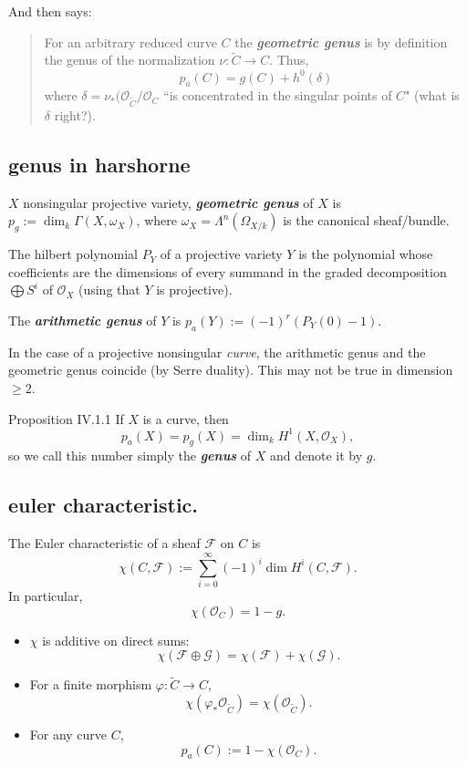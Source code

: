 And then \cite{huk} says:
\begin{quotation}
For an arbitrary reduced curve \(C\) the \textit{\textbf{geometric genus}} is by definition the genus of the normalization \(\nu:\tilde{C} \to C\). Thus, \[\boxed{p_a(C)=g(C)+h^{0}(\delta)}\]
where \(\delta=\nu_*(\mathcal{O}_{\tilde{C}}/\mathcal{O}_C\) ``is concentrated in the singular points of \(C\)" (what is \(\delta\) right?).
\end{quotation}

\subsection*{genus in harshorne}
\begin{defn}\leavevmode
\(X\) nonsingular projective variety, \textit{\textbf{geometric genus}} of \(X\) is \(p_g:=\dim_k\Gamma(X,\omega_X)\), where \(\omega_X=\Lambda^{n}(\Omega_{X/k})\) is the canonical sheaf/bundle.
\end{defn}

\begin{defn}[p. 54]\leavevmode
The hilbert polynomial \(P_Y\) of a projective variety  \(Y\) is the polynomial whose coefficients are the dimensions of every summand in the graded decomposition \(\bigoplus S^i\) of \(\mathcal{O}_X\) (using that \(Y\) is projective).

The \textit{\textbf{arithmetic genus}} of \(Y\) is \(p_a(Y):=(-1)^{r}(P_Y(0)-1).\)
\end{defn}

\begin{remark}\leavevmode
	In the case of a projective nonsingular \textit{curve}, the arithmetic genus and the geometric genus coincide (by Serre duality). This may not be true in dimension \(\geq 2\).
\end{remark}

\begin{thing4}{Proposition IV.1.1}\label{prop:IV.1.1}\leavevmode
If \(X\) is a curve, then
\[p_a(X)=p_g(X)=\dim_kH^{1}(X,\mathcal{O}_X),\]
so we call this number simply the \textit{\textbf{genus}} of \(X\) and denote it by \(g\).
\end{thing4}




\subsection{euler characteristic.}
The Euler characteristic of a sheaf \( \mathcal{F} \) on \( C \) is
\[
\chi(C, \mathcal{F}) := \sum_{i=0}^\infty (-1)^i \dim H^i(C, \mathcal{F}).
\]
In particular,
\[
\chi(\mathcal{O}_C) = 1 - g.
\]
\begin{itemize}
  \item \(\chi\) is additive on direct sums:
  \[
  \chi(\mathcal{F} \oplus \mathcal{G}) = \chi(\mathcal{F}) + \chi(\mathcal{G}).
  \]
  \item For a finite morphism \( \varphi: \widetilde{C} \to C \),
  \[
  \chi(\varphi_*\mathcal{O}_{\widetilde{C}}) = \chi(\mathcal{O}_{\widetilde{C}}).
  \]
  \item For any curve \( C \),
  \[
  p_a(C) := 1 - \chi(\mathcal{O}_C).
  \]
\end{itemize}

